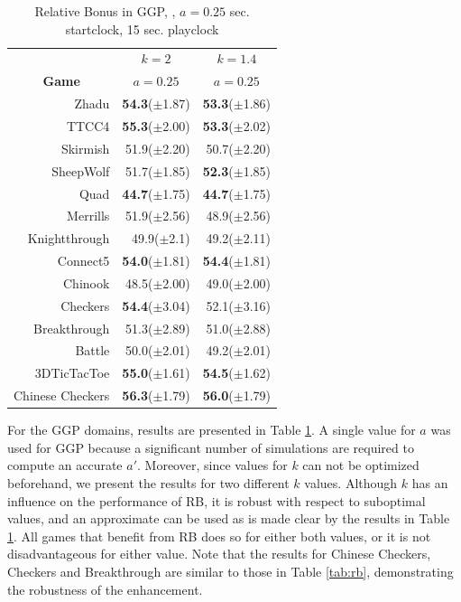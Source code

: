 \documentclass{ecai2014}
\begin{document}
\begin{table}
{\caption{Relative Bonus in GGP, {}, $a = 0.25$  sec. startclock, 15 sec. playclock} \label{tab:rb_ggp}}
\begin{center}
\begin{tabular}{rrr}
\hline
& \multicolumn{1}{c}{\textbf{$k = 2$}} & \multicolumn{1}{c}{\textbf{$k = 1.4$}} \\
\cline{1-3}
\multicolumn{1}{c|}{\rule{0pt}{12pt}\textbf{Game}} & \multicolumn{1}{c}{\textbf{$a = 0.25$}} & \multicolumn{1}{c}{\textbf{$a = 0.25$}} \\ \hline
\multicolumn{1}{r|}{Zhadu} 				&{\bf{54.3}}($\pm$1.87)		& {\bf{53.3}}($\pm$1.86) \\
\multicolumn{1}{r|}{TTCC4} 				&{\bf{55.3}}($\pm$2.00)		& {\bf{53.3}}($\pm$2.02) \\
\multicolumn{1}{r|}{Skirmish} 			&51.9($\pm$2.20)			& 50.7($\pm$2.20) \\
\multicolumn{1}{r|}{SheepWolf} 			&51.7($\pm$1.85)			& {\bf{52.3}}($\pm$1.85) \\
\multicolumn{1}{r|}{Quad} 				&{\bf{44.7}}($\pm$1.75)		& {\bf{44.7}}($\pm$1.75) \\
\multicolumn{1}{r|}{Merrills} 			&51.9($\pm$2.56)			& 48.9($\pm$2.56) \\
\multicolumn{1}{r|}{Knightthrough}		&49.9($\pm$2.1)				& 49.2($\pm$2.11) \\
\multicolumn{1}{r|}{Connect5} 			&{\bf{54.0}}($\pm$1.81)		& {\bf{54.4}}($\pm$1.81) \\
\multicolumn{1}{r|}{Chinook} 			&48.5($\pm$2.00)			& 49.0($\pm$2.00) \\
\multicolumn{1}{r|}{Checkers} 			&{\bf{54.4}}($\pm$3.04)		& 52.1($\pm$3.16) \\
\multicolumn{1}{r|}{Breakthrough}		&51.3($\pm$2.89)			& 51.0($\pm$2.88) \\
\multicolumn{1}{r|}{Battle}				&50.0($\pm$2.01)			& 49.2($\pm$2.01) \\
\multicolumn{1}{r|}{3DTicTacToe}		&{\bf{55.0}}($\pm$1.61)		& {\bf{54.5}}($\pm$1.62) \\
\multicolumn{1}{r|}{Chinese Checkers}	&{\bf{56.3}}($\pm$1.79)		& {\bf{56.0}}($\pm$1.79) \\
\hline
\end{tabular}
\end{center}
\end{table}

For the GGP domains, results are presented in Table \ref{tab:rb_ggp}. A single value for $a$ was used for GGP because a significant number of simulations are required to compute an accurate $a'$. Moreover, since values for $k$ can not be optimized beforehand, we present the results for two different $k$ values. Although $k$ has an influence on the performance of RB, it is robust with respect to suboptimal values, and an approximate can be used as is made clear by the results in Table \ref{tab:rb_ggp}. All games that benefit from RB does so for either both values, or it is not disadvantageous for either value. Note that the results for Chinese Checkers, Checkers and Breakthrough are similar to those in Table \ref{tab:rb}, demonstrating the robustness of the enhancement.
\end{document}
